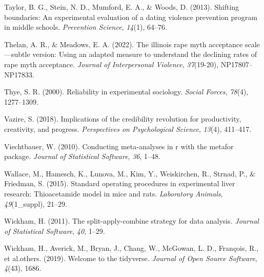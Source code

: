 \documentclass[
  man]{apa6}
\newlength{\cslhangindent}
\newenvironment{CSLReferences}[2] %
 {\begin{list}{}{%
  \setlength{\itemindent}{0pt}
  \setlength{\leftmargin}{0pt}
  \setlength{\parsep}{0pt}
  \ifodd #1
   \setlength{\leftmargin}{\cslhangindent}
   \setlength{\itemindent}{-1\cslhangindent}
  \fi
  \setlength{\itemsep}{#2\baselineskip}}}
 {\end{list}}
\begin{document}
\begin{CSLReferences}{1}{0}
Taylor, B. G., Stein, N. D., Mumford, E. A., \& Woods, D. (2013). Shifting boundaries: An experimental evaluation of a dating violence prevention program in middle schools. \emph{Prevention Science}, \emph{14}(1), 64--76.

Thelan, A. R., \& Meadows, E. A. (2022). The illinois rape myth acceptance scale---subtle version: Using an adapted measure to understand the declining rates of rape myth acceptance. \emph{Journal of Interpersonal Violence}, \emph{37}(19-20), NP17807--NP17833.

Thye, S. R. (2000). Reliability in experimental sociology. \emph{Social Forces}, \emph{78}(4), 1277--1309.

Vazire, S. (2018). Implications of the credibility revolution for productivity, creativity, and progress. \emph{Perspectives on Psychological Science}, \emph{13}(4), 411--417.

Viechtbauer, W. (2010). Conducting meta-analyses in r with the metafor package. \emph{Journal of Statistical Software}, \emph{36}, 1--48.

Wallace, M., Hamesch, K., Lunova, M., Kim, Y., Weiskirchen, R., Strnad, P., \& Friedman, S. (2015). Standard operating procedures in experimental liver research: Thioacetamide model in mice and rats. \emph{Laboratory Animals}, \emph{49}(1\_suppl), 21--29.

Wickham, H. (2011). The split-apply-combine strategy for data analysis. \emph{Journal of Statistical Software}, \emph{40}, 1--29.

Wickham, H., Averick, M., Bryan, J., Chang, W., McGowan, L. D., François, R., et al.others. (2019). Welcome to the tidyverse. \emph{Journal of Open Source Software}, \emph{4}(43), 1686.

\end{CSLReferences}
\end{document}
